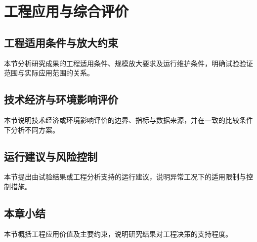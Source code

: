 \chapter{工程应用与综合评价}
\section{工程适用条件与放大约束}
本节分析研究成果的工程适用条件、规模放大要求及运行维护条件，明确试验验证范围与实际应用范围的关系。
\section{技术经济与环境影响评价}
本节说明技术经济或环境影响评价的边界、指标与数据来源，并在一致的比较条件下分析不同方案。
\section{运行建议与风险控制}
本节提出由试验结果或工程分析支持的运行建议，说明异常工况下的适用限制与控制措施。
\section{本章小结}
本节概括工程应用价值及主要约束，说明研究结果对工程决策的支持程度。
